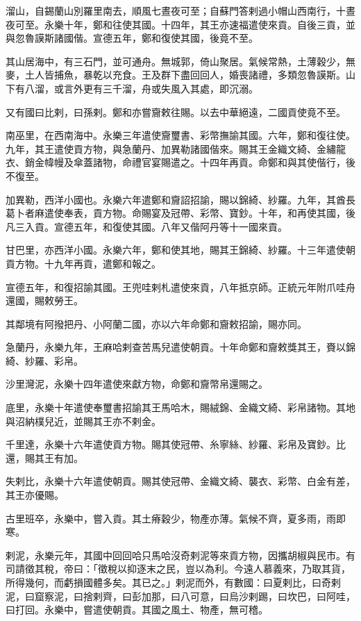 \begin{pinyinscope}
溜山，自錫蘭山別羅里南去，順風七晝夜可至；自蘇門答剌過小帽山西南行，十晝夜可至。永樂十年，鄭和往使其國。十四年，其王亦速福遣使來貢。自後三貢，並與忽魯謨斯諸國偕。宣德五年，鄭和復使其國，後竟不至。

其山居海中，有三石門，並可通舟。無城郭，倚山聚居。氣候常熱，土薄穀少，無麥，土人皆捕魚，暴乾以充食。王及群下盡回回人，婚喪諸禮，多類忽魯謨斯。山下有八溜，或言外更有三千溜，舟或失風入其處，即沉溺。

又有國曰比剌，曰孫剌。鄭和亦嘗齎敕往賜。以去中華絕遠，二國貢使竟不至。

南巫里，在西南海中。永樂三年遣使齎璽書、彩幣撫諭其國。六年，鄭和復往使。九年，其王遣使貢方物，與急蘭丹、加異勒諸國偕來。賜其王金織文綺、金繡龍衣、銷金幃幔及傘蓋諸物，命禮官宴賜遣之。十四年再貢。命鄭和與其使偕行，後不復至。

加異勒，西洋小國也。永樂六年遣鄭和齎詔招諭，賜以錦綺、紗羅。九年，其酋長葛卜者麻遣使奉表，貢方物。命賜宴及冠帶、彩幣、寶鈔。十年，和再使其國，後凡三入貢。宣德五年，和復使其國。八年又偕阿丹等十一國來貢。

甘巴里，亦西洋小國。永樂六年，鄭和使其地，賜其王錦綺、紗羅。十三年遣使朝貢方物。十九年再貢，遣鄭和報之。

宣德五年，和復招諭其國。王兜哇剌札遣使來貢，八年抵京師。正統元年附爪哇舟還國，賜敕勞王。

其鄰境有阿撥把丹、小阿蘭二國，亦以六年命鄭和齎敕招諭，賜亦同。

急蘭丹，永樂九年，王麻哈剌查苦馬兒遣使朝貢。十年命鄭和齎敕獎其王，賚以錦綺、紗羅、彩帛。

沙里灣泥，永樂十四年遣使來獻方物，命鄭和齎幣帛還賜之。

底里，永樂十年遣使奉璽書招諭其王馬哈木，賜絨錦、金織文綺、彩帛諸物。其地與沼納樸兒近，並賜其王亦不剌金。

千里達，永樂十六年遣使貢方物。賜其使冠帶、糸寧絲、紗羅、彩帛及寶鈔。比還，賜其王有加。

失剌比，永樂十六年遣使朝貢。賜其使冠帶、金織文綺、襲衣、彩幣、白金有差，其王亦優賜。

古里班卒，永樂中，嘗入貢。其土瘠穀少，物產亦薄。氣候不齊，夏多雨，雨即寒。

剌泥，永樂元年，其國中回回哈只馬哈沒奇剌泥等來貢方物，因攜胡椒與民市。有司請徵其稅，帝曰：「徵稅以抑逐末之民，豈以為利。今遠人慕義來，乃取其貨，所得幾何，而虧損國體多矣。其已之。」剌泥而外，有數國：曰夏剌比，曰奇剌泥，曰窟察泥，曰捨剌齊，曰彭加那，曰八可意，曰烏沙剌踢，曰坎巴，曰阿哇，曰打回。永樂中，嘗遣使朝貢。其國之風土、物產，無可稽。


\end{pinyinscope}
